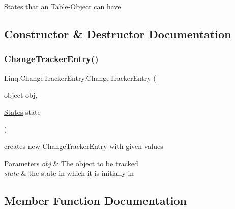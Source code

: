 States that an Table-\/\+Object can have 



\subsection{Constructor \& Destructor Documentation}
\mbox{\label{class_linq_1_1_change_tracker_entry_a9276ab8cf07caaca4252287401d7e1c6}} 
\subsubsection{\texorpdfstring{Change\+Tracker\+Entry()}{ChangeTrackerEntry()}}
{\footnotesize\ttfamily Linq.\+Change\+Tracker\+Entry.\+Change\+Tracker\+Entry (\begin{DoxyParamCaption}\item[{object}]{obj,  }\item[{\mbox{\hyperlink{class_linq_1_1_change_tracker_entry_aded3f97a3bd1326ae1b264c7618b7828}{States}}}]{state }\end{DoxyParamCaption})\hspace{0.3cm}{\ttfamily [inline]}}



creates new \mbox{\hyperlink{class_linq_1_1_change_tracker_entry}{Change\+Tracker\+Entry}} with given values 


\begin{DoxyParams}{Parameters}
{\em obj} & The object to be tracked\\
\hline
{\em state} & the state in which it is initially in\\
\hline
\end{DoxyParams}


\subsection{Member Function Documentation}
\mbox{\label{class_linq_1_1_change_tracker_entry_a7de1eab4061b442ad072961ff18792aa}} 

